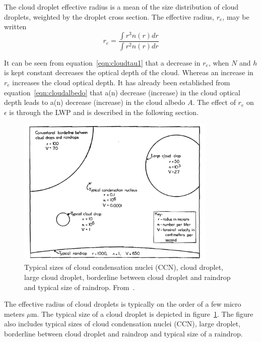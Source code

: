 The cloud droplet effective radius is a mean of the size distribution of cloud droplets, weighted by the droplet cross section. The effective radius, $r_e$, may be written
\begin{equation}
r_e = \frac{\int r^3 n(r) dr}{\int r^2 n(r) dr}
\label{eqn:re}
\end{equation}

It can be seen from equation~\ref{eqn:cloudtau1} that a decrease in $r_e$, when $N$ and $h$ is kept constant decreases the optical depth of the cloud. Whereas an increase in $r_e$ increases the cloud optical depth. It has already been established from equation~\ref{eqn:cloudalbedo} that a(n) decrease (increase) in the cloud optical depth leads to a(n) decrease (increase) in the cloud albedo $A$. The effect of $r_e$ on $\epsilon$ is through the LWP and is described in the following section.

\begin{figure}
\centering
\includegraphics[width=0.85\textwidth]{theory/dropletsize.png}
\caption{Typical sizes of cloud condensation nuclei (CCN), cloud droplet, large cloud droplet, borderline between cloud droplet and raindrop and typical size of raindrop. %
From~\citep{McDonald1958}.}
\label{fig:dropletsize}
\end{figure}

The effective radius of cloud droplets is typically on the order of a few micro meters $\mu\text{m}$. The typical size of a cloud droplet is depicted in figure~\ref{fig:dropletsize}. The figure also includes typical sizes of cloud condensation nuclei (CCN), large droplet, borderline between cloud droplet and raindrop and typical size of a raindrop.


